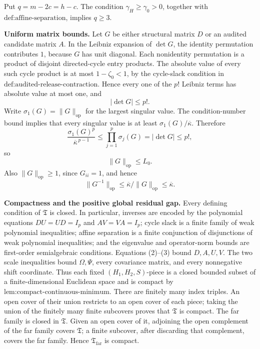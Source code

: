 Put \(q=m-2c=h-c\).  The condition \(\gamma_H\geq\gamma _0>0\), together with \(\text{def:affine-separation}\), implies \(q\geq3\).

\textbf{Uniform matrix bounds.}
Let \(G\) be either structural matrix \(D\) or an audited candidate matrix \(A\).  In the Leibniz expansion of \(\det G\), the identity permutation contributes \(1\), because \(G\) has unit diagonal.  Each nonidentity permutation is a product of disjoint directed-cycle entry products.  The absolute value of every such cycle product is at most \(1-\zeta _0<1\), by the cycle-slack condition in \(\text{def:audited-release-contraction}\).  Hence every one of the \(p!\) Leibniz terms has absolute value at most one, and
\[
 |\det G|\leq p!.
 \tag{1}
\]
Write \(\sigma_1(G)=\|G\|_{\mathrm{op}}\) for the largest singular value.  The condition-number bound implies that every singular value is at least \(\sigma_1(G)/\overline\kappa\).  Therefore
\[
 \frac{\sigma_1(G)^p}{\overline\kappa^{\,p-1}}
 \leq\prod_{j=1}^p\sigma_j(G)=|\det G|\leq p!,
\]
so
\[
 \|G\|_{\mathrm{op}}\leq L_0.
 \tag{2}
\]
Also \(\|G\|_{\mathrm{op}}\geq1\), since \(G_{ii}=1\), and hence
\[
 \|G^{-1}\|_{\mathrm{op}}
 \leq\overline\kappa/\|G\|_{\mathrm{op}}\leq\overline\kappa.
 \tag{3}
\]

\textbf{Compactness and the positive global residual gap.}
Every defining condition of \(\mathfrak T\) is closed.  In particular, inverses are encoded by the polynomial equations \(DU=UD=I_p\) and \(AV=VA=I_p\); cycle slack is a finite family of weak polynomial inequalities; affine separation is a finite conjunction of disjunctions of weak polynomial inequalities; and the eigenvalue and operator-norm bounds are first-order semialgebraic conditions.  Equations (2)--(3) bound \(D,A,U,V\).  The two scale inequalities bound \(\Omega,\Psi\), every covariance matrix, and every nonnegative shift coordinate.  Thus each fixed \((H_1,H_2,S)\)-piece is a closed bounded subset of a finite-dimensional Euclidean space and is compact by \(\text{lem:compact-continuous-minimum}\).  There are finitely many index triples.  An open cover of their union restricts to an open cover of each piece; taking the union of the finitely many finite subcovers proves that \(\mathfrak T\) is compact.  The far family is closed in \(\mathfrak T\).  Given an open cover of it, adjoining the open complement of the far family covers \(\mathfrak T\); a finite subcover, after discarding that complement, covers the far family.  Hence \(\mathfrak T_{\mathrm{far}}\) is compact.

